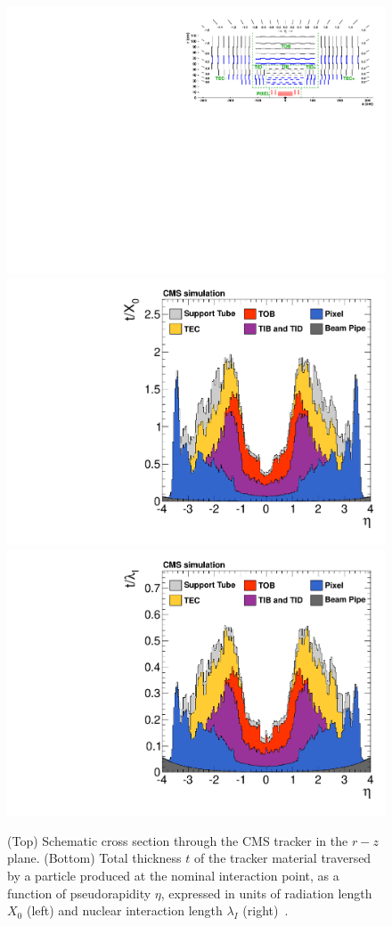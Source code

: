 \begin{figure}\centering
\includegraphics[width=.9\textwidth]{figs/cms/TrackerLayoutNew.pdf}\\
\includegraphics[width=.45\textwidth]{figs/cms/MaterialBudget_RadLengths.pdf}
\includegraphics[width=.45\textwidth]{figs/cms/MaterialBudget_InteractionLengths.pdf}
\caption{(Top) Schematic cross section through the CMS tracker in the $r-z$
  plane. (Bottom) Total thickness $t$ of the tracker material
  traversed by a particle produced at the nominal interaction point,
  as a function of pseudorapidity $\eta$, expressed in units of radiation
  length $X_0$ (left) and nuclear interaction length $\lambda_I$
  (right)~\cite{Chatrchyan:2014fea}. \label{fig:tracker}}
\end{figure}

